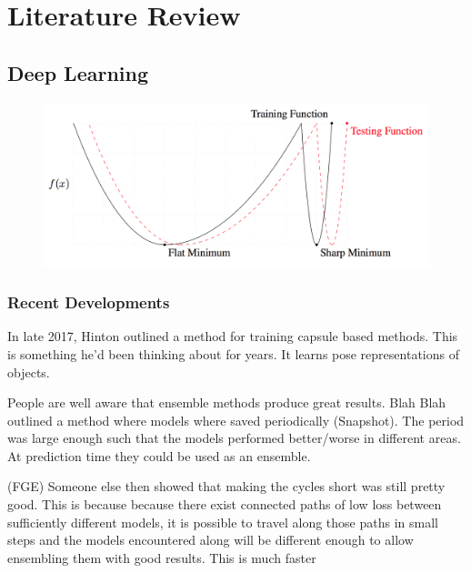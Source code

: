 
\chapter{Literature Review}\label{cha:literature}

\section{Deep Learning}\label{sec:deep_learning_lit}

\begin{figure}
    \centering
    \includegraphics[width=\textwidth]{./img/Wide_optima.png}
    \caption{\cite{Keskar_Mudigere_Nocedal_Smelyanskiy_Tang_2016}}
    \label{fig:wide_optima}
\end{figure}


\subsection{Recent Developments}\label{subsec:recent_improvements}
In late 2017, Hinton outlined a method for training capsule based methods.
This is something he'd been thinking about for years.
It learns pose representations of objects.

People are well aware that ensemble methods produce great results.
Blah Blah outlined a method where models where saved periodically (Snapshot).
The period was large enough such that the models performed better/worse in different areas.
At prediction time they could be used as an ensemble.

(FGE) Someone else then showed that making the cycles short was still pretty good.
This is because because there exist connected paths of low loss between sufficiently different models, it is possible to travel along those paths in small steps and the models encountered along will be different enough to allow ensembling them with good results.
This is much faster



